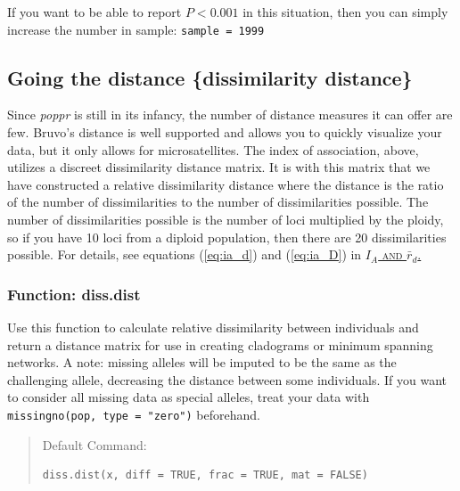 \documentclass[letterpaper]{article}\usepackage[]{graphicx}\usepackage[]{color}
\makeatletter
\newenvironment{kframe}{%
 \def\at@end@of@kframe{}%
 \ifinner\ifhmode%
  \def\at@end@of@kframe{\end{minipage}}%
  \begin{minipage}{\columnwidth}%
 \fi\fi%
 \def\FrameCommand##1{\hskip\@totalleftmargin \hskip-\fboxsep
 \colorbox{shadecolor}{##1}\hskip-\fboxsep
     \hskip-\linewidth \hskip-\@totalleftmargin \hskip\columnwidth}%
 \MakeFramed {\advance\hsize-\width
   \@totalleftmargin\z@ \linewidth\hsize
   \@setminipage}}%
 {\par\unskip\endMakeFramed%
 \at@end@of@kframe}
\newenvironment{knitrout}{}{} %
\newcommand{\tab}{\hspace*{1em}}
\newcommand{\seclink}[2]{
  \textsc{\hyperref[#1]{#2}}
}
\newcommand{\poppr}{\textit{poppr}}
\makeatother
\begin{document}
If you want to be able to report $P < 0.001$ in this situation, then you can simply increase the number in sample: \texttt{sample = 1999}
%
\subsection{Going the distance \{dissimilarity distance\}}
\label{index:dist}
\tab\tab Since \poppr{} is still in its infancy, the number of distance measures it can offer are few. Bruvo's distance is well supported and allows you to quickly visualize your data, but it only allows for microsatellites. The index of association, above, utilizes a discreet dissimilarity distance matrix. It is with this matrix that we have constructed a relative dissimilarity distance where the distance is the ratio of the number of dissimilarities to the number of dissimilarities possible. The number of dissimilarities possible is the number of loci multiplied by the ploidy, so if you have 10 loci from a diploid population, then there are 20 dissimilarities possible. For details, see equations (\ref{eq:ia_d}) and (\ref{eq:ia_D}) in\seclink{appendix:algorithm:iard}{$I_A$ and $\bar{r}_d$.} 

\subsubsection{Function: diss.dist}
\label{index:dist:diss.dist}

\tab\tab Use this function to calculate relative dissimilarity between individuals and return a distance matrix for use in creating cladograms or minimum spanning networks. A note: missing alleles will be imputed to be the same as the challenging allele, decreasing the distance between some individuals. If you want to consider all missing data as special alleles, treat your data with \texttt{missingno(pop, type = "zero")} beforehand. 

\begin{quote}
Default Command:
\begin{knitrout}
\color{fgcolor}\begin{kframe}
\begin{verbatim}
diss.dist(x, diff = TRUE, frac = TRUE, mat = FALSE)
\end{verbatim}
\end{kframe}
\end{knitrout}

\end{quote}
\end{document}
